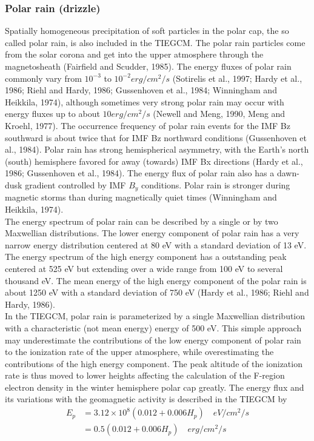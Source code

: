 \subsubsection{Polar rain (drizzle)}\label{cap:aurora_polarrain}
%
Spatially homogeneous precipitation of soft particles in the polar cap, 
the so called polar rain, is also included in the TIEGCM. The polar rain 
particles come from the solar corona and get into the upper atmosphere 
through the magnetosheath (Fairfield and Scudder, 1985). The energy fluxes 
of polar rain commonly vary from $10^{-3}$ to $10^{-2} erg/cm^2/s$ (Sotirelis et al., 1997; 
Hardy et al., 1986; Riehl and Hardy, 1986; Gussenhoven et al., 1984; 
Winningham and Heikkila, 1974), although sometimes very strong polar rain 
may occur with energy fluxes up to about $10 erg/cm^2/s$ (Newell and Meng, 
1990, Meng and Kroehl, 1977). The occurrence frequency of polar rain events 
for the IMF Bz southward is about twice that for IMF Bz northward conditions 
(Gussenhoven et al., 1984). Polar rain has strong hemispherical asymmetry, with 
the Earth's north (south) hemisphere favored for away (towards) IMF Bx directions 
(Hardy et al., 1986; Gussenhoven et al., 1984). The energy flux of polar rain also 
has a dawn-dusk gradient controlled by IMF $B_y$ conditions. Polar rain is stronger 
during magnetic storms than during magnetically quiet times 
(Winningham and Heikkila, 1974).  \\
%
The energy spectrum of polar rain can be described by a 
single or by two Maxwellian distributions. The lower energy 
component of polar rain has a very narrow energy distribution 
centered at 80 eV with a standard deviation of 13 eV. The energy 
spectrum of the high energy component has a outstanding peak centered 
at 525 eV but extending over a wide range from 100 eV to several thousand 
eV. The mean energy of the high energy component of the polar rain is about 
1250 eV with a standard deviation of 750 eV (Hardy et al., 1986; 
Riehl and Hardy, 1986). \\
%
In the TIEGCM, polar rain is parameterized by a single 
Maxwellian distribution with a characteristic (not mean energy) 
energy of 500 eV. This simple approach may underestimate the 
contributions of the low energy component of polar rain to the 
ionization rate of the upper atmosphere, while overestimating the 
contributions of the high energy component. The peak altitude of the 
ionization rate is thus moved to lower heights affecting the calculation 
of the F-region electron density in the winter hemisphere polar cap 
greatly. The energy flux and its variations with the geomagnetic
 activity is described in the TIEGCM by
%
\begin{equation}
  \begin{split}
      E_p & = 3.12 \times 10^8 (0.012 + 0.006 H_p) \quad  eV/cm^2/s \\
          & = 0.5(0.012 + 0.006  H_p) \quad  erg/cm^2/s
    \label{eq:aurora_13}
  \end{split}
\end{equation}
%   
%
